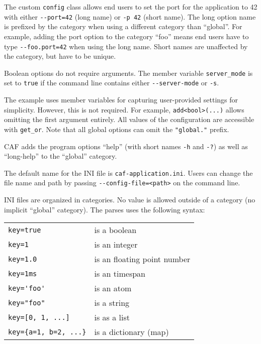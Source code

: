 The custom \lstinline^config^ class allows end users to set the port for the
application to 42 with either \lstinline^--port=42^ (long name) or
\lstinline^-p 42^ (short name). The long option name is prefixed by the
category when using a different category than ``global''. For example, adding
the port option to the category ``foo'' means end users have to type
\lstinline^--foo.port=42^ when using the long name. Short names are unaffected
by the category, but have to be unique.

Boolean options do not require arguments. The member variable
\lstinline^server_mode^ is set to \lstinline^true^ if the command line contains
either \lstinline^--server-mode^ or \lstinline^-s^.

The example uses member variables for capturing user-provided settings for
simplicity. However, this is not required. For example,
\lstinline^add<bool>(...)^ allows omitting the first argument entirely. All
values of the configuration are accessible with \lstinline^get_or^. Note that
all global options can omit the \lstinline^"global."^ prefix.

CAF adds the program options ``help'' (with short names \lstinline^-h^ and
\lstinline^-?^) as well as ``long-help'' to the ``global'' category.

The default name for the INI file is \lstinline^caf-application.ini^. Users can
change the file name and path by passing \lstinline^--config-file=<path>^ on
the command line.

INI files are organized in categories. No value is allowed outside of a
category (no implicit ``global'' category). The parses uses the following
syntax:

\begin{tabular}{p{}p{}}
  \lstinline^key=true^ & is a boolean \\
  \lstinline^key=1^ & is an integer \\
  \lstinline^key=1.0^ & is an floating point number \\
  \lstinline^key=1ms^ & is an timespan \\
  \lstinline^key='foo'^ & is an atom \\
  \lstinline^key="foo"^ & is a string \\
  \lstinline^key=[0, 1, ...]^ & is as a list \\
  \lstinline^key={a=1, b=2, ...}^ & is a dictionary (map) \\
\end{tabular}

